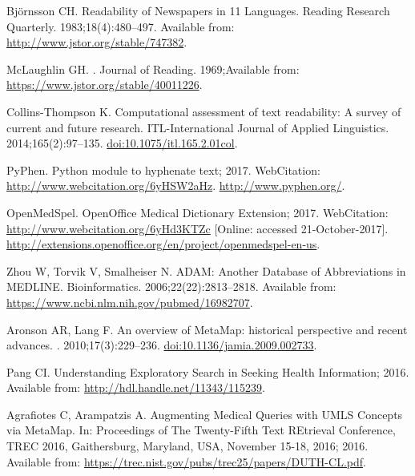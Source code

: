 \documentclass[10pt,a4paper]{article}
\begin{document}
\begin{thebibliography}{10}
	Bj{\"o}rnsson CH.
	\newblock Readability of Newspapers in 11 Languages.
	\newblock Reading Research Quarterly. 1983;18(4):480--497.
	\newblock Available from: \url{http://www.jstor.org/stable/747382}.
	
	McLaughlin GH.
	.
	\newblock Journal of Reading. 1969;Available from:
	\url{https://www.jstor.org/stable/40011226}.
	
	Collins-Thompson K.
	\newblock Computational assessment of text readability: A survey of current and
	future research.
	\newblock ITL-International Journal of Applied Linguistics.
	2014;165(2):97--135.
	\newblock \href {http://dx.doi.org/10.1075/itl.165.2.01col}
	{doi:10.1075/itl.165.2.01col}.
	
	PyPhen. Python module to hyphenate text; 2017.
	 WebCitation:
	\url{http://www.webcitation.org/6yHSW2aHz}.
	\newblock \url{http://www.pyphen.org/}.
	
	OpenMedSpel. OpenOffice Medical Dictionary Extension; 2017.
	\newblock WebCitation: \url{http://www.webcitation.org/6yHd3KTZc} [Online:
	accessed 21-October-2017].
	\newblock \url{http://extensions.openoffice.org/en/project/openmedspel-en-us}.
	
	Zhou W, Torvik V, Smalheiser N.
	\newblock ADAM: Another Database of Abbreviations in MEDLINE.
	\newblock Bioinformatics. 2006;22(22):2813--2818.
	\newblock Available from: \url{https://www.ncbi.nlm.nih.gov/pubmed/16982707}.
	
	Aronson AR, Lang F.
	\newblock An overview of MetaMap: historical perspective and recent advances.
	. 2010;17(3):229--236.
	\newblock \href {http://dx.doi.org/10.1136/jamia.2009.002733}
	{doi:10.1136/jamia.2009.002733}.
	
	Pang CI. Understanding Exploratory Search in Seeking Health Information; 2016.
	\newblock Available from: \url{http://hdl.handle.net/11343/115239}.
	
	Agrafiotes C, Arampatzis A.
	\newblock Augmenting Medical Queries with {UMLS} Concepts via MetaMap.
	\newblock In: Proceedings of The Twenty-Fifth Text REtrieval Conference, {TREC}
	2016, Gaithersburg, Maryland, USA, November 15-18, 2016; 2016. Available
	from: \url{https://trec.nist.gov/pubs/trec25/papers/DUTH-CL.pdf}.
	

\end{thebibliography}
\end{document}
